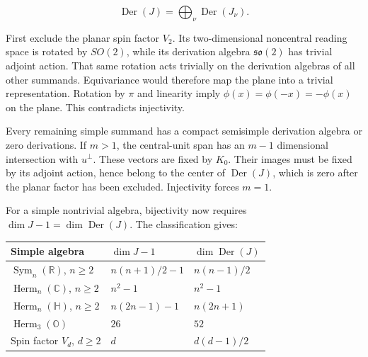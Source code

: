 \documentclass[
  11pt,
  a4paper,
]{article}
\newcounter{none} %
\begin{document}
\[\operatorname{Der}(J)=\bigoplus_\nu\operatorname{Der}(J_\nu).\]

First exclude the planar spin factor \(V_2\). Its two-dimensional noncentral reading space is rotated by \(SO(2)\), while its derivation algebra \(\mathfrak{so}(2)\) has trivial adjoint action. That same rotation acts trivially on the derivation algebras of all other summands. Equivariance would therefore map the plane into a trivial representation. Rotation by \(\pi\) and linearity imply \(\phi(x)=\phi(-x)=-\phi(x)\) on the plane. This contradicts injectivity.

Every remaining simple summand has a compact semisimple derivation algebra or zero derivations. If \(m>1\), the central-unit span has an \(m-1\) dimensional intersection with \(u^\perp\). These vectors are fixed by \(K_0\). Their images must be fixed by its adjoint action, hence belong to the center of \(\operatorname{Der}(J)\), which is zero after the planar factor has been excluded. Injectivity forces \(m=1\).

For a simple nontrivial algebra, bijectivity now requires \(\dim J-1=\dim\operatorname{Der}(J)\). The classification gives:

{\def\LTcaptype{none} %
\begin{longtable}[]{@{}
  >{\raggedright\arraybackslash}p{}
  >{\raggedleft\arraybackslash}p{}
  >{\raggedleft\arraybackslash}p{}@{}}
\toprule\noalign{}
\begin{minipage}[b]{\linewidth}\raggedright
Simple algebra
\end{minipage} & \begin{minipage}[b]{\linewidth}\raggedleft
\(\dim J-1\)
\end{minipage} & \begin{minipage}[b]{\linewidth}\raggedleft
\(\dim\operatorname{Der}(J)\)
\end{minipage} \\
\midrule\noalign{}
\endhead
\bottomrule\noalign{}
\endlastfoot
\(\operatorname{Sym}_n(\mathbb R)\), \(n\ge2\) & \(n(n+1)/2-1\) & \(n(n-1)/2\) \\
\(\operatorname{Herm}_n(\mathbb C)\), \(n\ge2\) & \(n^2-1\) & \(n^2-1\) \\
\(\operatorname{Herm}_n(\mathbb H)\), \(n\ge2\) & \(n(2n-1)-1\) & \(n(2n+1)\) \\
\(\operatorname{Herm}_3(\mathbb O)\) & \(26\) & \(52\) \\
Spin factor \(V_d\), \(d\ge2\) & \(d\) & \(d(d-1)/2\) \\
\end{longtable}
}
\end{document}
